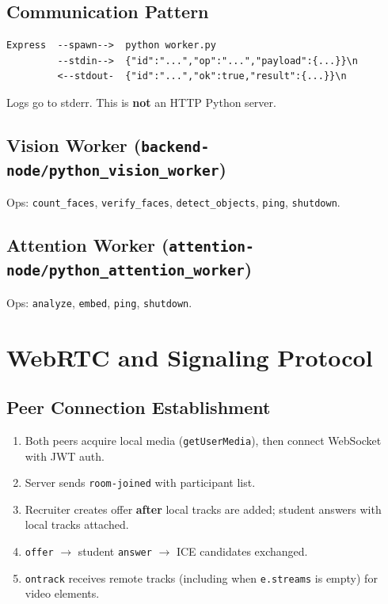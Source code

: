 \documentclass[11pt,a4paper]{report}
\begin{document}
\section{Communication Pattern}
\begin{verbatim}
Express  --spawn-->  python worker.py
         --stdin-->  {"id":"...","op":"...","payload":{...}}\n
         <--stdout-  {"id":"...","ok":true,"result":{...}}\n
\end{verbatim}
Logs go to stderr. This is \textbf{not} an HTTP Python server.

\section{Vision Worker (\texttt{backend-node/python\_vision\_worker})}
Ops: \texttt{count\_faces}, \texttt{verify\_faces}, \texttt{detect\_objects}, \texttt{ping}, \texttt{shutdown}.

\section{Attention Worker (\texttt{attention-node/python\_attention\_worker})}
Ops: \texttt{analyze}, \texttt{embed}, \texttt{ping}, \texttt{shutdown}.

\chapter{WebRTC and Signaling Protocol}

\section{Peer Connection Establishment}
\begin{enumerate}
  \item Both peers acquire local media (\texttt{getUserMedia}), then connect WebSocket with JWT auth.
  \item Server sends \texttt{room-joined} with participant list.
  \item Recruiter creates offer \textbf{after} local tracks are added; student answers with local tracks attached.
  \item \texttt{offer} $\rightarrow$ student \texttt{answer} $\rightarrow$ ICE candidates exchanged.
  \item \texttt{ontrack} receives remote tracks (including when \texttt{e.streams} is empty) for video elements.
\end{enumerate}
\end{document}

